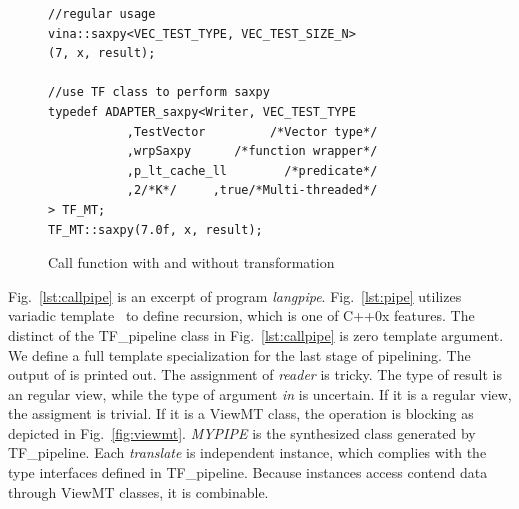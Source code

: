 \documentclass[10pt, conference, compsocconf]{IEEEtran}
\begin{document}
\begin{figure}[!htp]
\begin{minipage}[tb]{\linewidth}
\makebox[\textwidth]{\hrulefill}
\begin{small}
\begin{verbatim}
//regular usage
vina::saxpy<VEC_TEST_TYPE, VEC_TEST_SIZE_N>
(7, x, result);
  
//use TF class to perform saxpy
typedef ADAPTER_saxpy<Writer, VEC_TEST_TYPE 
           ,TestVector         /*Vector type*/
           ,wrpSaxpy      /*function wrapper*/
           ,p_lt_cache_ll        /*predicate*/
           ,2/*K*/     ,true/*Multi-threaded*/
> TF_MT;
TF_MT::saxpy(7.0f, x, result);
\end{verbatim}
\end{small}
\vspace{-1ex}\makebox[\textwidth]{\hrulefill}
\end{minipage}
\caption{Call function with and without transformation}\label{lst:callsaxpy}
\end{figure}
Fig.~\ref{lst:callpipe} is an excerpt of program \textit{langpipe}. 
Fig.~\ref{lst:pipe} utilizes variadic template~\cite{vartemp} to
define recursion, which is one of C++0x features. The distinct of the
TF\_pipeline class in Fig.~\ref{lst:callpipe} is zero template
argument. We define a full template specialization for the last stage
of pipelining. The output of is printed out. The assignment of \textit{reader} is tricky. The type of
result is an regular view, while the type of argument \textit{in} is
uncertain. If it is a regular view, the assigment is trivial. If it is
a ViewMT class, the operation is blocking as depicted in Fig.~\ref{fig:viewmt}. \textit{MYPIPE} is the
synthesized class generated by TF\_pipeline. Each
\textit{translate} is independent instance, which complies with the
type interfaces defined in TF\_pipeline. Because instances access
contend data through ViewMT classes, it is combinable.
\end{document}
